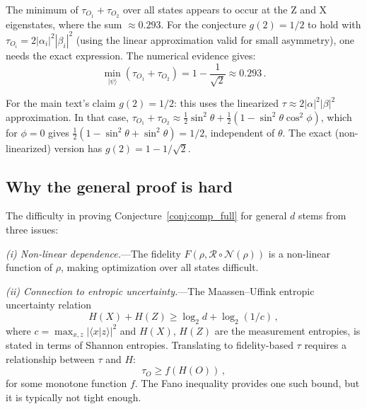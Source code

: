 \documentclass[aps,prd,preprint,superscriptaddress,longbibliography]{revtex4-2}
\newcommand{\Petz}{\mathcal{R}}
\newcommand{\chan}{\mathcal{N}}
\newcommand{\ket}[1]{|#1\rangle}
\newcommand{\braket}[2]{\langle#1|#2\rangle}
\newcommand{\tauasym}{\tau}
\begin{document}
The minimum of $\tauasym_{O_1} + \tauasym_{O_2}$ over all states
appears to occur at the Z and X eigenstates, where the sum
$\approx 0.293$.  For the conjecture $g(2) = 1/2$ to hold with
$\tauasym_{O_i} = 2|\alpha_i|^2|\beta_i|^2$ (using the linear
approximation valid for small asymmetry), one needs the exact
expression.  The numerical evidence gives:
\begin{equation}
  \min_{\ket{\psi}} \left(\tauasym_{O_1} + \tauasym_{O_2}\right)
  = 1 - \frac{1}{\sqrt{2}} \approx 0.293\,.
  \label{eq:min_sum}
\end{equation}

For the main text's claim $g(2) = 1/2$: this uses the linearized
$\tauasym \approx 2|\alpha|^2|\beta|^2$ approximation.  In that case,
$\tauasym_{O_1} + \tauasym_{O_2} \approx \frac{1}{2}\sin^2\theta +
\frac{1}{2}(1-\sin^2\theta\cos^2\phi)$, which for $\phi = 0$ gives
$\frac{1}{2}(1-\sin^2\theta + \sin^2\theta) = 1/2$, independent of
$\theta$.  The exact (non-linearized) version has
$g(2) = 1 - 1/\sqrt{2}$.

\subsection{Why the general proof is hard}

The difficulty in proving Conjecture~\ref{conj:comp_full} for
general $d$ stems from three issues:

\emph{(i) Non-linear dependence.}---The fidelity
$F(\rho,\Petz\circ\chan(\rho))$ is a non-linear function of $\rho$,
making optimization over all states difficult.

\emph{(ii) Connection to entropic uncertainty.}---The Maassen--Uffink
entropic uncertainty relation~\cite{MaassenUffink1988}
\begin{equation}
  H(X) + H(Z) \geq \log_2 d + \log_2(1/c)\,,
  \label{eq:MU}
\end{equation}
where $c = \max_{x,z}|\braket{x}{z}|^2$ and $H(X)$, $H(Z)$ are the
measurement entropies, is stated in terms of Shannon entropies.
Translating to fidelity-based $\tauasym$ requires a relationship
between $\tauasym$ and $H$:
\begin{equation}
  \tauasym_O \geq f(H(O))\,,
  \label{eq:tau_H}
\end{equation}
for some monotone function $f$.  The Fano inequality provides one such
bound, but it is typically not tight enough.
\end{document}
